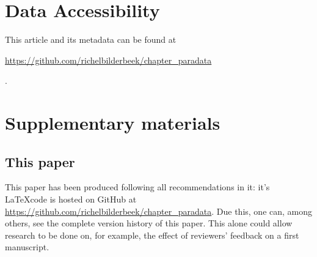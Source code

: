 \section{Data Accessibility}

This article and its metadata can be found at 
\begin{sloppypar}\url{https://github.com/richelbilderbeek/chapter_paradata}\end{sloppypar}.




\newpage
\appendix
\section{Supplementary materials}

\renewcommand{\thefigure}{S\arabic{figure}}
\setcounter{figure}{0}

\renewcommand{\thetable}{S\arabic{table}}
\setcounter{table}{0}

\subsection{This paper}

This paper has been produced following all recommendations in it:
it's \LaTeX code is hosted on GitHub 
at \url{https://github.com/richelbilderbeek/chapter_paradata}.
Due this, one can, among others, see the complete version history of this paper.
This alone could allow research to be done on, for example,
the effect of reviewers' feedback on a first manuscript.


